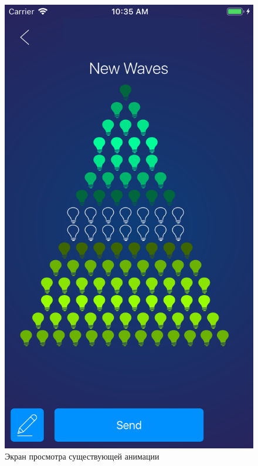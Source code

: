 ~
\begin{figure}[H]
\centering
	\includegraphics[scale=0.2]{figures/userGuide/previewDefault.png}
	\caption{Экран просмотра существующей анимации}
	\label{fig:develop:userGuide:previewDefault}
\end{figure}
~
